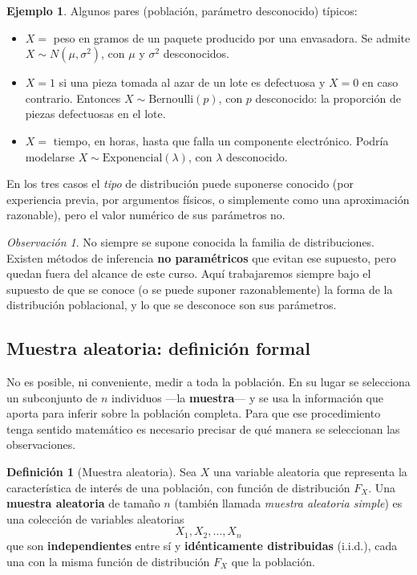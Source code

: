 \documentclass[11pt,a4paper]{article}
\theoremstyle{plain}
\theoremstyle{definition}
\newtheorem{definicion}[teorema]{Definición}
\newtheorem{ejemplo}[teorema]{Ejemplo}
\theoremstyle{remark}
\newtheorem{observacion}[teorema]{Observación}
\begin{document}
\begin{ejemplo}
Algunos pares (población, parámetro desconocido) típicos:
\begin{itemize}
\item $X=$ peso en gramos de un paquete producido por una envasadora. Se admite $X\sim N(\mu,\sigma^2)$, con $\mu$ y $\sigma^2$ desconocidos.
\item $X=1$ si una pieza tomada al azar de un lote es defectuosa y $X=0$ en caso contrario. Entonces $X\sim \text{Bernoulli}(p)$, con $p$ desconocido: la proporción de piezas defectuosas en el lote.
\item $X=$ tiempo, en horas, hasta que falla un componente electrónico. Podría modelarse $X\sim \text{Exponencial}(\lambda)$, con $\lambda$ desconocido.
\end{itemize}
En los tres casos el \emph{tipo} de distribución puede suponerse conocido (por experiencia previa, por argumentos físicos, o simplemente como una aproximación razonable), pero el valor numérico de sus parámetros no.
\end{ejemplo}

\begin{observacion}
No siempre se supone conocida la familia de distribuciones. Existen métodos de inferencia \textbf{no paramétricos} que evitan ese supuesto, pero quedan fuera del alcance de este curso. Aquí trabajaremos siempre bajo el supuesto de que se conoce (o se puede suponer razonablemente) la forma de la distribución poblacional, y lo que se desconoce son sus parámetros.
\end{observacion}

\subsection{Muestra aleatoria: definición formal}

No es posible, ni conveniente, medir a toda la población. En su lugar se selecciona un subconjunto de $n$ individuos —la \textbf{muestra}— y se usa la información que aporta para inferir sobre la población completa. Para que ese procedimiento tenga sentido matemático es necesario precisar de qué manera se seleccionan las observaciones.

\begin{definicion}[Muestra aleatoria]
Sea $X$ una variable aleatoria que representa la característica de interés de una población, con función de distribución $F_X$. Una \textbf{muestra aleatoria} de tamaño $n$ (también llamada \emph{muestra aleatoria simple}) es una colección de variables aleatorias
$$X_1, X_2, \dots, X_n$$
que son \textbf{independientes} entre sí y \textbf{idénticamente distribuidas} (i.i.d.), cada una con la misma función de distribución $F_X$ que la población.
\end{definicion}
\end{document}
